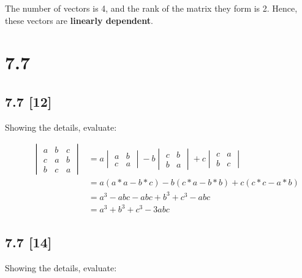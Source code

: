 \documentclass{article}
\begin{document}
The number of vectors is 4, and the rank of the matrix they form is 2.  Hence, these vectors are \textbf{linearly dependent}.

\newpage

\section*{7.7}
\setcounter{equation}{0}

\subsection*{7.7 [12]}
\setcounter{equation}{0}

Showing the details, evaluate:

\begin{align}
    \label{eq:1}
    && \begin{vmatrix}
    a & b & c\\
    c & a & b\\
    b & c & a
    \end{vmatrix} &= a\begin{vmatrix} a & b\\c & a \end{vmatrix} - b\begin{vmatrix}c&b\\b&a\end{vmatrix} + c\begin{vmatrix}c&a\\b&c\end{vmatrix}
    \\
    \label{eq:2}
    && &= a(a*a-b*c) - b(c*a-b*b) + c(c*c-a*b)
    \\
    \label{eq:3}
    && &= a^3-abc-abc+b^3+c^3-abc
    \\
    \label{eq:4}
    && &= a^3+b^3+c^3-3abc
\end{align}

\subsection*{7.7 [14]}
\setcounter{equation}{0}

Showing the details, evaluate:
\end{document}

